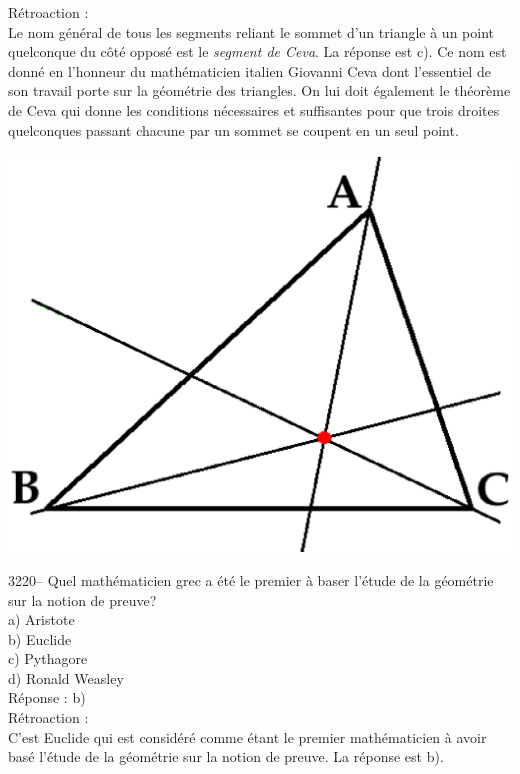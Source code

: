 \documentclass[letterpaper, 12pt]{article}
\begin{document}
R\'etroaction :\\
Le nom g\'en\'eral de tous les segments reliant le sommet d'un triangle \`a un point quelconque du c\^ot\'e oppos\'e est le \emph{segment de Ceva}. La r\'eponse est c). Ce nom est donn\'e en l'honneur du math\'ematicien italien Giovanni Ceva dont l'essentiel de son travail porte sur la g\'eom\'etrie des triangles. On lui doit \'egalement le th\'eor\`eme de Ceva qui donne les conditions n\'ecessaires et suffisantes pour que trois droites quelconques passant chacune par un sommet se coupent en un seul point.
\begin{center}
\includegraphics[scale=0.25]{thmCeva.eps}\\[5mm]
\end{center}



3220-- Quel math\'ematicien grec a \'et\'e le premier \`a baser l'\'etude de la g\'eom\'etrie sur la notion de preuve?\\

a) Aristote\\
b) Euclide\\
c) Pythagore\\
d) Ronald Weasley\\

R\'eponse : b)\\

R\'etroaction :\\
C'est Euclide qui est consid\'er\'e comme \'etant le premier math\'ematicien \`a avoir bas\'e l'\'etude de la g\'eom\'etrie sur la notion de preuve. La r\'eponse est b).\\
\end{document}

